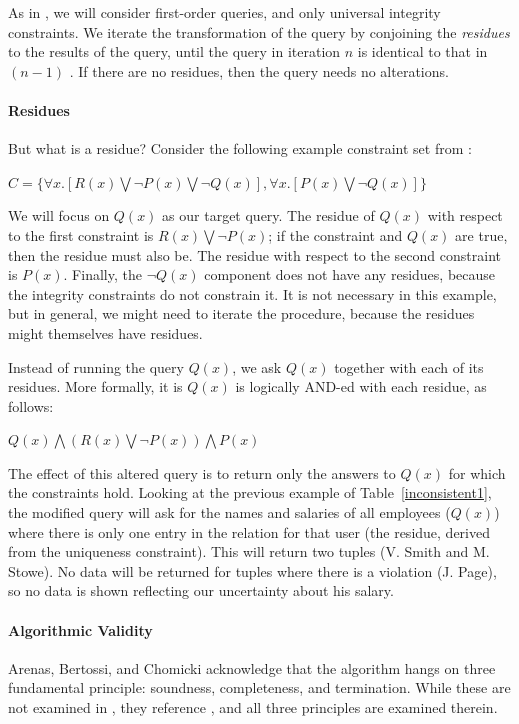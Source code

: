 As in \cite{CQ}, we will consider first-order queries, and only universal integrity constraints. We iterate the transformation of the query by conjoining the \textit{residues} to the results of the query, until the query in iteration $n$ is identical to that in $(n-1)$ \cite{CQ}. If there are no residues, then the query needs no alterations.

\paragraph{Residues}
But what is a residue? Consider the following example constraint set from \cite{CQ}:
\begin{center}
$C = \{\forall x.[R(x) \bigvee \neg P(x) \bigvee \neg Q(x)], \forall x.[P(x) \bigvee \neg Q(x)] \}$ 
\end{center}

We will focus on $Q(x)$ as our target query. The residue of $Q(x)$ with respect to the first constraint is $R(x) \bigvee \neg P(x)$; if the constraint and $Q(x)$ are true, then the residue must also be. The residue with respect to the second constraint is $P(x)$. Finally, the $\neg Q(x)$ component does not have any residues, because the integrity constraints do not constrain it. It is not necessary in this example, but in general, we might need to iterate the procedure, because the residues might themselves have residues.

Instead of running the query $Q(x)$, we ask $Q(x)$ together with each of its residues. More formally, it is $Q(x)$ is logically AND-ed with each residue, as follows:

\begin{center}
$Q(x) \bigwedge (R(x) \bigvee \neg P(x)) \bigwedge P(x)$
\end{center}

The effect of this altered query is to return only the answers to $Q(x)$ for which the constraints hold. Looking at the previous example of Table~\ref{inconsistent1}, the modified query will ask for the names and salaries of all employees ($Q(x)$) where there is only one entry in the relation for that user (the residue, derived from the uniqueness constraint). This will return two tuples (V. Smith and M. Stowe). No data will be returned for tuples where there is a violation (J. Page), so no data is shown reflecting our uncertainty about his salary.

\paragraph{Algorithmic Validity} Arenas, Bertossi, and Chomicki acknowledge that the algorithm hangs on three fundamental principle: soundness, completeness, and termination. While these are not examined in \cite{CQ}, they reference \cite{CQI}, and all three principles are examined therein.

